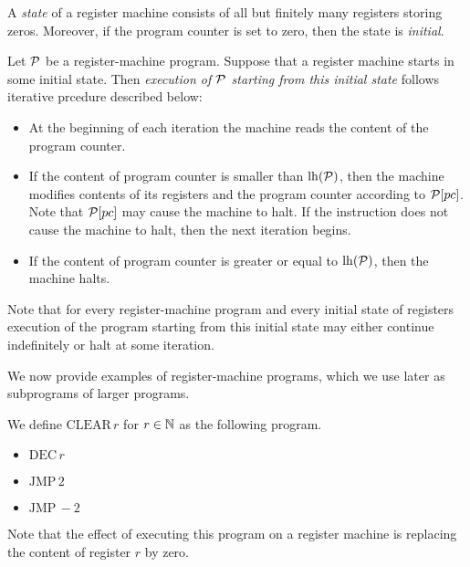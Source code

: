 \documentclass[10pt]{amsart}
\begin{document}
\begin{definition}
	A \textit{state} of a register machine consists of all but finitely many registers storing zeros. Moreover, if the program counter is set to zero, then the state is \textit{initial}.
\end{definition}

\begin{definition}
	Let ${\mathcal P}$ be a register-machine program. Suppose that a register machine starts in some initial state. Then \textit{execution of ${\mathcal P}$ starting from this initial state} follows iterative prcedure described below:
	\begin{itemize}
		\item[] At the beginning of each iteration the machine reads the content of the program counter.
		\item[] If the content of program counter is smaller than $\mathrm{lh}({\mathcal P})$, then the machine modifies contents of its registers and the program counter according to ${\mathcal P}[pc]$. Note that ${\mathcal P}[pc]$ may cause the machine to halt. If the instruction does not cause the machine to halt, then the next iteration begins.
		\item[] If the content of program counter is greater or equal to $\mathrm{lh}({\mathcal P})$, then the machine halts.
	\end{itemize}
\end{definition}

\begin{remark}\label{remark:each_execution_either_halts_or_not}
	Note that for every register-machine program and every initial state of registers execution of the program starting from this initial state may either continue indefinitely or halt at some iteration.
\end{remark}
\noindent
We now provide examples of register-machine programs, which we use later as subprograms of larger programs.

\begin{example}\label{example:clear_register_program}
	We define $\mathrm{CLEAR}\,r$ for $r \in {\mathbb N}$ as the following program.
	\begin{itemize}
		\item[] $\mathrm{DEC}\,r$
		\item[] $\mathrm{JMP}\,2$
		\item[] $\mathrm{JMP}\,-2$
	\end{itemize}
	Note that the effect of executing this program on a register machine is replacing the content of register $r$ by zero.
\end{example}
\end{document}
